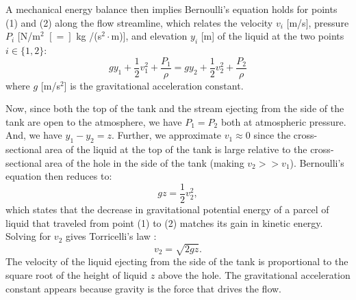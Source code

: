 \documentclass[a4paper,fleqn]{cas-sc}
\begin{document}
	A mechanical energy balance then implies Bernoulli's equation \cite{welty2020fundamentals} holds for points (1) and (2) along the flow streamline, which relates the velocity $v_i$ [m/s], pressure $P_i$ [N/m$^2$ $[=]$ kg /(s$^2\cdot$m)], and elevation $y_i$ [m] of the liquid at the two points $i\in\{1,2\}$:
	\begin{equation}
	g y_1 + \frac{1}{2} v_1^2 + \frac{P_1}{\rho} = gy_2 + \frac{1}{2} v_2^2 + \frac{P_2}{\rho} 
	\end{equation}
	where $g$ [m/s$^2$] is the gravitational acceleration constant. 
	
	Now, since both the top of the tank and the stream ejecting from the side of the tank are open to the atmosphere, we have $P_1=P_2$ both at atmospheric pressure. And, we have $y_1-y_2=z$. Further, we approximate $v_1\approx 0$ since the cross-sectional area of the liquid at the top of the tank is large relative to the cross-sectional area of the hole in the side of the tank (making $v_2 >> v_1$). Bernoulli's equation then reduces to:
	\begin{equation}
	g z  = \frac{1}{2} v_2^2,
	\end{equation}
	which states that the decrease in gravitational potential energy of a parcel of liquid that traveled from point (1) to (2) matches its gain in kinetic energy. Solving for $v_2$ gives Torricelli's law \cite{driver1998torricelli}:
	\begin{equation}
	v_2 = \sqrt{2gz}.
	\end{equation}
	The velocity of the liquid ejecting from the side of the tank is proportional to the square root of the height of liquid $z$ above the hole. The gravitational acceleration constant appears because gravity is the force that drives the flow.


\clearpage



 
\end{document}
